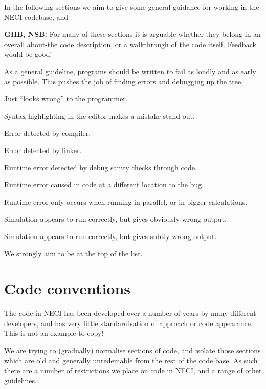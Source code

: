 \documentclass[a4paper,notitlepage]{scrreprt}
\newenvironment{packed_enum}{
	\begin{enumerate}
		\setlength{\itemsep}{1pt}
		\setlength{\parskip}{0pt}
		\setlength{\parsep}{0pt}
	}{\end{enumerate}}
\begin{document}
In the following sections we aim to give some general guidance for working in
the NECI codebase, and 

\textbf{GHB, NSB:} For many of these sections it is arguable whether they
belong in an overall about-the code description, or a walkthrough of the code
itself. Feedback would be good!

\begin{mdframed}[ %
	linewidth = 2pt, %
	linecolor = red, %
	roundcorner = 6pt, %
	leftmargin = 10, %
	rightmargin = 10, %
	backgroundcolor = gray!20
]
As a general guideline, programs should be written to fail as loudly and as
early as possible. This pushes the job of finding errors and debugging up
the tree.

\begin{packed_enum}
	\item Just ``looks wrong'' to the programmer.
	\item Syntax highlighting in the editor makes a mistake stand out.
	\item Error detected by compiler.
	\item Error detected by linker.
	\item Runtime error detected by debug sanity checks through code.
	\item Runtime error caused in code at a different location to the bug.
	\item
		Runtime error only occurs when running in parallel, or in bigger
		calculations.
	\item
		Simulation appears to run correctly, but gives obviously wrong output.
	\item
		Simulation appears to run correctly, but gives subtly wrong output.
\end{packed_enum}
We strongly aim to be at the top of the list.
\end{mdframed}

\section{Code conventions}
The code in NECI has been developed over a number of years by many different
developers, and has very little standardisation of approach or code appearance.
This is not an example to copy!

We are trying to (gradually) normalise sections of code, and isolate those
sections which are old and generally unredemable from the rest of the code
base. As such there are a number of restrictions we place on code in NECI,
and a range of other guidelines.
\end{document}
